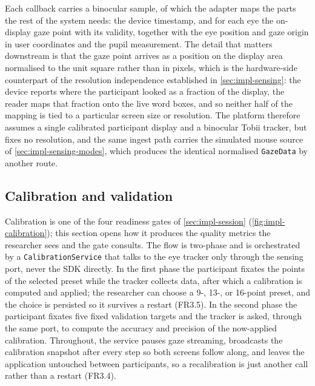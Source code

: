 Each callback carries a binocular sample, of which the adapter maps the parts the rest of the system needs: the device timestamp, and for each eye the on-display gaze point with its validity, together with the eye position and gaze origin in user coordinates and the pupil measurement.
The detail that matters downstream is that the gaze point arrives as a position on the display area normalised to the unit square rather than in pixels, which is the hardware-side counterpart of the resolution independence established in \cref{sec:impl-sensing}: the device reports where the participant looked as a fraction of the display, the reader maps that fraction onto the live word boxes, and so neither half of the mapping is tied to a particular screen size or resolution.
The platform therefore assumes a single calibrated participant display and a binocular Tobii tracker, but fixes no resolution, and the same ingest path carries the simulated mouse source of \cref{sec:impl-sensing-modes}, which produces the identical normalised \texttt{GazeData} by another route.

\FloatBarrier
\subsection{Calibration and validation}
\label{sec:impl-calibration}

Calibration is one of the four readiness gates of \cref{sec:impl-session} (\cref{fig:impl-calibration}); this section opens how it produces the quality metrics the researcher sees and the gate consults.
The flow is two-phase and is orchestrated by a \texttt{CalibrationService} that talks to the eye tracker only through the sensing port, never the SDK directly.
In the first phase the participant fixates the points of the selected preset while the tracker collects data, after which a calibration is computed and applied; the researcher can choose a 9-, 13-, or 16-point preset, and the choice is persisted so it survives a restart (FR3.5).
In the second phase the participant fixates five fixed validation targets and the tracker is asked, through the same port, to compute the accuracy and precision of the now-applied calibration.
Throughout, the service pauses gaze streaming, broadcasts the calibration snapshot after every step so both screens follow along, and leaves the application untouched between participants, so a recalibration is just another call rather than a restart (FR3.4).

